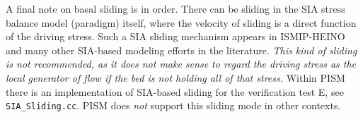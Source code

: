 A final note on basal sliding is in order.  There can be sliding in the SIA stress balance model (paradigm) itself, where the velocity of sliding is a direct function of the driving stress.  Such a SIA sliding mechanism appears in ISMIP-HEINO \cite{Calovetal2009HEINOfinal} and many other SIA-based modeling efforts in the literature.  \emph{This kind of sliding is not recommended, as it does not make sense to regard the driving stress as the local generator of flow if the bed is not holding all of that stress.}  Within PISM there is an implementation of SIA-based sliding for the verification test E, see \texttt{SIA_Sliding.cc}.  PISM does \emph{not} support this sliding mode in other contexts.  




